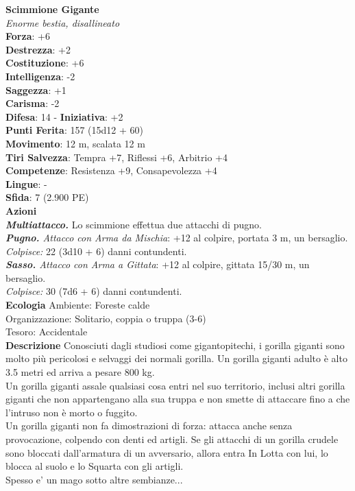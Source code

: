 \begin{multicols}{2}
\medskip\textbf{Scimmione Gigante}\\
\emph{Enorme bestia, disallineato}\\
\textbf{Forza}: +6\\
\textbf{Destrezza}: +2\\
\textbf{Costituzione}: +6\\
\textbf{Intelligenza}: -2\\
\textbf{Saggezza}: +1\\
\textbf{Carisma}: -2\\
\textbf{Difesa}: 14 - \textbf{Iniziativa}: +2\\
\textbf{Punti Ferita}: 157 (15d12 + 60)\\
\textbf{Movimento}: 12 m, scalata 12 m\\
\textbf{Tiri Salvezza}: Tempra +7, Riflessi +6, Arbitrio +4\\
\textbf{Competenze}: Resistenza +9, Consapevolezza +4\\
\textbf{Lingue}: -\\
\textbf{Sfida}: 7 (2.900 PE)\smallskip\\
\smallskip\textbf{Azioni}\\
\emph{\textbf{Multiattacco.}} Lo scimmione effettua due attacchi di pugno.\\
\emph{\textbf{Pugno.} Attacco con Arma da Mischia}: +12 al colpire, portata 3 m, un bersaglio.\\
\emph{Colpisce:} 22 (3d10 + 6) danni contundenti. \\
\emph{\textbf{Sasso.} Attacco con Arma a Gittata}: +12 al colpire, gittata 15/30 m, un bersaglio.\\
\emph{Colpisce:} 30 (7d6 + 6) danni contundenti.\\
\textbf{Ecologia}
Ambiente: Foreste calde\\
Organizzazione: Solitario, coppia o truppa (3-6)\\
Tesoro: Accidentale\\
\textbf{Descrizione}
Conosciuti dagli studiosi come gigantopitechi, i gorilla giganti sono molto più pericolosi e selvaggi dei normali gorilla. Un gorilla giganti adulto è alto 3.5 metri ed arriva a pesare 800 kg.\\
Un gorilla giganti assale qualsiasi cosa entri nel suo territorio, inclusi altri gorilla giganti che non appartengano alla sua truppa e non smette di attaccare fino a che l'intruso non è morto o fuggito.\\
Un gorilla giganti non fa dimostrazioni di forza: attacca anche senza provocazione, colpendo con denti ed artigli. Se gli attacchi di un gorilla crudele sono bloccati dall'armatura di un avversario, allora entra In Lotta con lui, lo blocca al suolo e lo Squarta con gli artigli.\\
Spesso e' un mago sotto altre sembianze...\\



\end{multicols}
